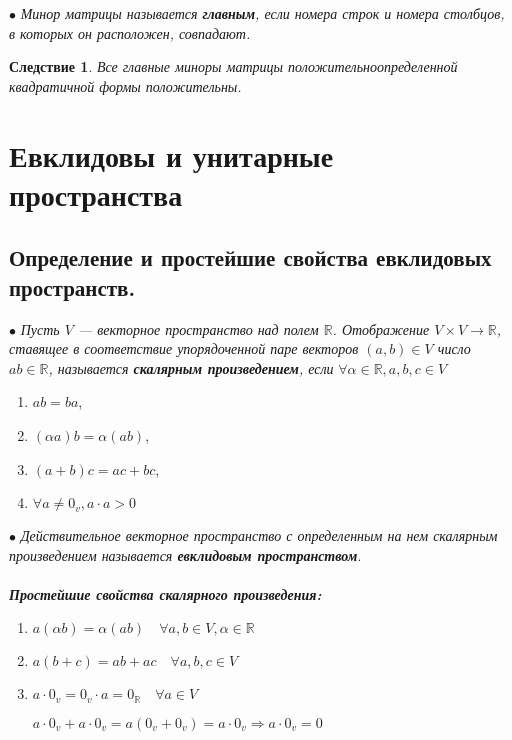 $\bullet$ \textit{Минор матрицы называется \textbf{главным}, если номера строк и номера столбцов, в которых он расположен, совпадают.}
\newtheorem*{cor13_5_4}{Следствие}\begin{cor13_5_4}Все главные миноры матрицы положительноопределенной квадратичной формы положительны.
\end{cor13_5_4}













\chapter{Евклидовы и унитарные пространства}
\section{Определение и простейшие свойства евклидовых пространств.}
$\bullet$ \textit{Пусть $V$ --- векторное пространство над полем $\mathbb{R}$. Отображение $V \times V \rightarrow \mathbb{R}$, ставящее в соответствие упорядоченной паре векторов
	$(a,b) \in V$ число $ab \in \mathbb{R}$, называется \textbf{скалярным произведением}, если} $\forall\alpha \in \mathbb{R}, a, b, c \in V$\begin{enumerate}
	\item $ab=ba$,
	\item $(\alpha a)b=\alpha(ab)$,
	\item $(a+b)c=ac+bc$,
	\item $\forall a \ne 0_v, a\cdot a>0$
\end{enumerate}
$\bullet$ \textit{Действительное векторное пространство с определенным на нем скалярным произведением называется \textbf{евклидовым пространством}}.\\\\
\textit{\textbf{Простейшие свойства скалярного произведения:}}\begin{enumerate}
	\item $a(\alpha b)=\alpha(ab)\quad \forall a,b \in V, \alpha \in \mathbb{R}$
	\item $a(b+c)=ab+ac\quad\forall a,b,c\in V$
	\item $a\cdot 0_v=0_v \cdot a =0_{\mathbb{R}}\quad \forall a \in V$
	\begin{Proof}
		$a\cdot 0_v+ a\cdot 0_v= a(0_v+0_v)=a \cdot 0_v \Rightarrow  a\cdot 0_v=0$
	\end{Proof}
\end{enumerate}
